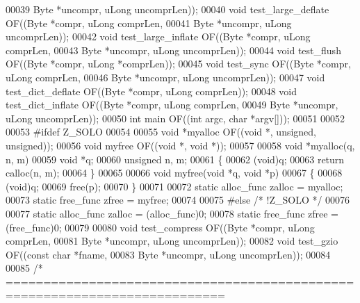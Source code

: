 \begin{DoxyCode}
{00039                             Byte *uncompr, uLong uncomprLen));
00040 \textcolor{keywordtype}{void} test\_large\_deflate OF((Byte *compr, uLong comprLen,
00041                             Byte *uncompr, uLong uncomprLen));
00042 \textcolor{keywordtype}{void} test\_large\_inflate OF((Byte *compr, uLong comprLen,
00043                             Byte *uncompr, uLong uncomprLen));
00044 \textcolor{keywordtype}{void} test\_flush         OF((Byte *compr, uLong *comprLen));
00045 \textcolor{keywordtype}{void} test\_sync          OF((Byte *compr, uLong comprLen,
00046                             Byte *uncompr, uLong uncomprLen));
00047 \textcolor{keywordtype}{void} test\_dict\_deflate  OF((Byte *compr, uLong comprLen));
00048 \textcolor{keywordtype}{void} test\_dict\_inflate  OF((Byte *compr, uLong comprLen,
00049                             Byte *uncompr, uLong uncomprLen));
00050 \textcolor{keywordtype}{int}  main               OF((\textcolor{keywordtype}{int} argc, \textcolor{keywordtype}{char} *argv[]));
00051 
00052 
00053 \textcolor{preprocessor}{#ifdef Z\_SOLO}
00054 
00055 \textcolor{keywordtype}{void} *myalloc OF((\textcolor{keywordtype}{void} *, \textcolor{keywordtype}{unsigned}, \textcolor{keywordtype}{unsigned}));
00056 \textcolor{keywordtype}{void} myfree OF((\textcolor{keywordtype}{void} *, \textcolor{keywordtype}{void} *));
00057 
00058 \textcolor{keywordtype}{void} *myalloc(q, n, m)
00059     \textcolor{keywordtype}{void} *q;
00060     \textcolor{keywordtype}{unsigned} n, m;
00061 \{
00062     (void)q;
00063     \textcolor{keywordflow}{return} calloc(n, m);
00064 \}
00065 
00066 \textcolor{keywordtype}{void} myfree(\textcolor{keywordtype}{void} *q, \textcolor{keywordtype}{void} *p)
00067 \{
00068     (void)q;
00069     free(p);
00070 \}
00071 
00072 \textcolor{keyword}{static} alloc\_func zalloc = myalloc;
00073 \textcolor{keyword}{static} free\_func zfree = myfree;
00074 
00075 \textcolor{preprocessor}{#else }\textcolor{comment}{/* !Z\_SOLO */}\textcolor{preprocessor}{}
00076 
00077 \textcolor{keyword}{static} alloc\_func zalloc = (alloc\_func)0;
00078 \textcolor{keyword}{static} free\_func zfree = (free\_func)0;
00079 
00080 \textcolor{keywordtype}{void} test\_compress      OF((Byte *compr, uLong comprLen,
00081                             Byte *uncompr, uLong uncomprLen));
00082 \textcolor{keywordtype}{void} test\_gzio          OF((\textcolor{keyword}{const} \textcolor{keywordtype}{char} *fname,
00083                             Byte *uncompr, uLong uncomprLen));
00084 
00085 \textcolor{comment}{/* ===========================================================================}
}
\end{DoxyCode}
